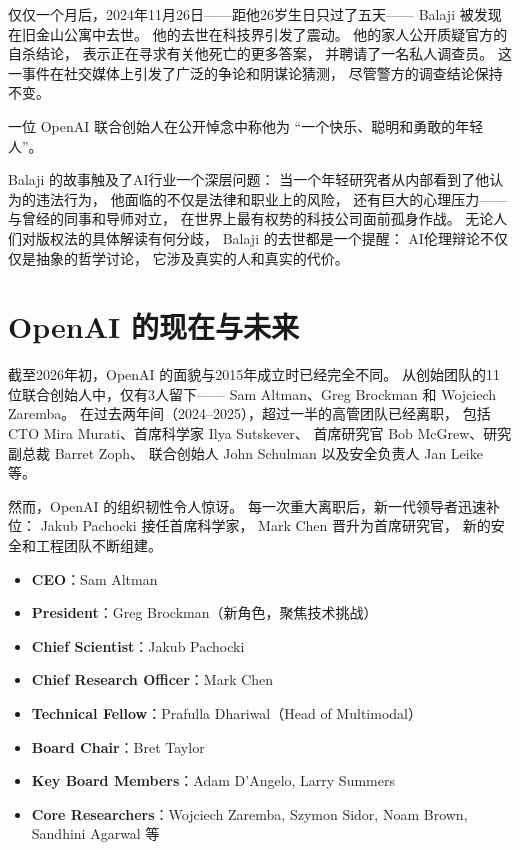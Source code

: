 仅仅一个月后，2024年11月26日——距他26岁生日只过了五天——
Balaji 被发现在旧金山公寓中去世。
他的去世在科技界引发了震动。
他的家人公开质疑官方的自杀结论，
表示正在寻求有关他死亡的更多答案，
并聘请了一名私人调查员。
这一事件在社交媒体上引发了广泛的争论和阴谋论猜测，
尽管警方的调查结论保持不变。

一位 OpenAI 联合创始人在公开悼念中称他为
``一个快乐、聪明和勇敢的年轻人''。

\begin{warnbox}
Balaji 的故事触及了AI行业一个深层问题：
当一个年轻研究者从内部看到了他认为的违法行为，
他面临的不仅是法律和职业上的风险，
还有巨大的心理压力——
与曾经的同事和导师对立，
在世界上最有权势的科技公司面前孤身作战。
无论人们对版权法的具体解读有何分歧，
Balaji 的去世都是一个提醒：
AI伦理辩论不仅仅是抽象的哲学讨论，
它涉及真实的人和真实的代价。
\end{warnbox}


\section{OpenAI 的现在与未来}
\label{sec:openai-present-future}

截至2026年初，OpenAI 的面貌与2015年成立时已经完全不同。
从创始团队的11位联合创始人中，仅有3人留下——
Sam Altman、Greg Brockman 和 Wojciech Zaremba。
在过去两年间（2024--2025），超过一半的高管团队已经离职，
包括 CTO Mira Murati、首席科学家 Ilya Sutskever、
首席研究官 Bob McGrew、研究副总裁 Barret Zoph、
联合创始人 John Schulman 以及安全负责人 Jan Leike 等。

然而，OpenAI 的组织韧性令人惊讶。
每一次重大离职后，新一代领导者迅速补位：
Jakub Pachocki 接任首席科学家，
Mark Chen 晋升为首席研究官，
新的安全和工程团队不断组建。

\begin{corebox}
\begin{itemize}[noitemsep]
  \item \textbf{CEO}：Sam Altman
  \item \textbf{President}：Greg Brockman（新角色，聚焦技术挑战）
  \item \textbf{Chief Scientist}：Jakub Pachocki
  \item \textbf{Chief Research Officer}：Mark Chen
  \item \textbf{Technical Fellow}：Prafulla Dhariwal（Head of Multimodal）
  \item \textbf{Board Chair}：Bret Taylor
  \item \textbf{Key Board Members}：Adam D'Angelo, Larry Summers
  \item \textbf{Core Researchers}：Wojciech Zaremba, Szymon Sidor,
        Noam Brown, Sandhini Agarwal 等
\end{itemize}
\end{corebox}

